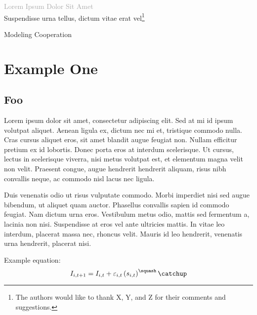 \begingroup
\center
\vspace*{2\baselineskip}
{\textcolor{darkgray}{\fontsize{29.87pt}{39.82pt}\selectfont Lorem Ipsum Dolor Sit Amet}}\\[\baselineskip]
{\huge Suspendisse urna tellus, dictum vitae erat vel\footnote{The authors would like to thank X, Y, and Z for their comments and suggestions.}}\\[\baselineskip]
\par
\vspace*{2\baselineskip}
{\Large Modeling Cooperation}\\
\endgroup

\thispagestyle{empty}

\newpage
\tableofcontents
\newpage

\chapter{Example One}

\section{Foo}

Lorem ipsum dolor sit amet, consectetur adipiscing elit. Sed at mi id ipsum volutpat aliquet. Aenean ligula ex, dictum nec mi et, tristique commodo nulla. Cras cursus aliquet eros, sit amet blandit augue feugiat non. Nullam efficitur pretium ex id lobortis. Donec porta eros at interdum scelerisque. Ut cursus, lectus in scelerisque viverra, nisi metus volutpat est, et elementum magna velit non velit. Praesent congue, augue hendrerit hendrerit aliquam, risus nibh convallis neque, ac commodo nisl lacus nec ligula.

Duis venenatis odio ut risus vulputate commodo. Morbi imperdiet nisi sed augue bibendum, ut aliquet quam auctor. Phasellus convallis sapien id commodo feugiat. Nam dictum urna eros. Vestibulum metus odio, mattis sed fermentum a, lacinia non nisi. Suspendisse at eros vel ante ultricies mattis. In vitae leo interdum, placerat massa nec, rhoncus velit. Mauris id leo hendrerit, venenatis urna hendrerit, placerat nisi.

Example equation:
\begin{equation}\label{eq:individualprod}
  I_{i,t+1}=I_{i,t}+\varepsilon_{i,t}\left(s_{i,t}\right)^{\squash}\catchup
\end{equation}

